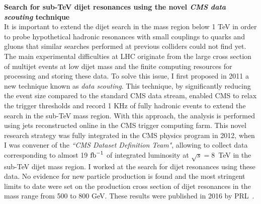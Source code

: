 \documentclass[10pt, a4paper]{article}
\begin{document}
{\bf Search for sub-TeV dijet resonances using the novel {\it CMS data scouting} technique}\\[0.5em]
It is important to extend the dijet search in the
mass region below 1 TeV in order to probe hypothetical hadronic resonances with small
couplings to quarks and gluons that similar searches performed at previous
colliders could not find yet. The main experimental difficulties at LHC originate
from the large cross section of multijet events at low dijet mass 
and the finite computing resources for processing and storing these
data. To solve this issue, I first proposed in 2011 a new technique known as 
{\it data scouting}. This technique, by significantly reducing the event size
compared to the standard CMS data stream, enabled CMS to relax the
trigger thresholds and record 1 KHz of fully hadronic events to extend
the search in the sub-TeV mass region. With this approach, the
analysis is performed using jets reconstructed online in the CMS
trigger computing farm. 
This novel research strategy was fully integrated in the CMS physics program in
2012, when I was convener of the {\it``CMS Dataset Definition Team"}, 
allowing to collect data corresponding to almost 19 $\rm{fb}^{-1}$ of
integrated luminosity at $\sqrt{s}=8$~TeV in the sub-TeV dijet mass region. 
I worked at the search for dijet resonances using these data.  
No evidence for new particle production is found and the most
stringent limits to date were set on the production cross section of dijet resonances
in the mass range from 500 to 800 GeV. These results were published in
2016 by PRL~\cite{Khachatryan:2016ecr}. \\ [1em]
\end{document}

